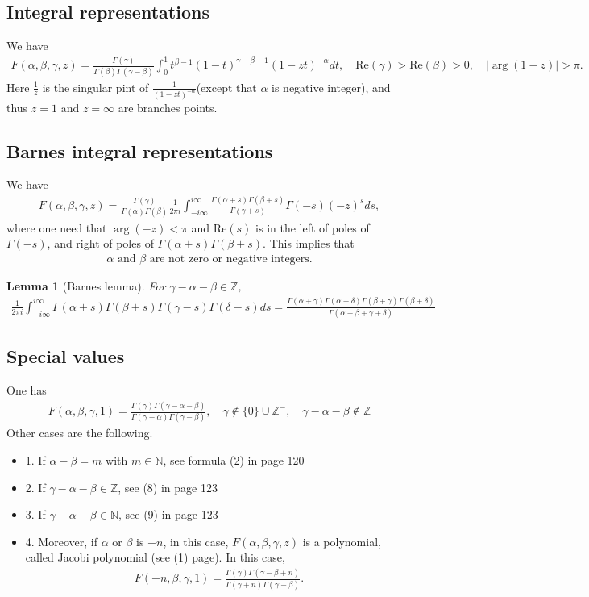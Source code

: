 \documentclass[11pt,reqno]{amsart}
\newcommand{\bna}{\begin{eqnarray*}}
\newcommand{\ena}{\end{eqnarray*}}
\def\re{{\mathrm{Re}}}
\def\Z{\mathbb{Z}}
\newtheorem{lemma}{Lemma}[section]
\theoremstyle{definition}
\newcommand{\bit}{\begin{itemize}}
\newcommand{\eit}{\end{itemize}}
\begin{document}
\subsection{Integral representations}
We have
\bna
F(\alpha,\beta,\gamma,z)=\frac{\Gamma(\gamma)}{\Gamma(\beta)\Gamma(\gamma-\beta)}
\int_0^1 t^{\beta-1}(1-t)^{\gamma-\beta-1}(1-zt)^{-\alpha}dt,
\quad \re(\gamma)>\re(\beta)>0,\quad |\arg(1-z)|>\pi.
\ena
Here $\frac{1}{z}$ is the singular pint of $\frac{1}{(1-zt)^{-\alpha}}$(except that $\alpha$ is negative integer),
and thus $z=1$ and $z=\infty$ are branches points.

\subsection{Barnes integral representations}
We have
\bna
F(\alpha,\beta,\gamma,z)=\frac{\Gamma(\gamma)}{\Gamma(\alpha)\Gamma(\beta)}
\frac{1}{2\pi i}\int_{-i\infty}^{i\infty}\frac{\Gamma(\alpha+s)\Gamma(\beta+s)}{\Gamma(\gamma+s)}
\Gamma(-s) (-z)^sds,
\ena
where one need that $\arg(-z)<\pi$ and
$\re(s)$ is in the left of poles of $\Gamma(-s)$,
and right of poles of $\Gamma(\alpha+s)\Gamma(\beta+s)$. This implies that
\bna
\mbox{$\alpha$ and $\beta$  are not zero or negative integers.}
\ena
\begin{lemma}[Barnes lemma]
For $\gamma-\alpha-\beta\in \Z$,
\bna
\frac{1}{2\pi i}\int_{-i\infty}^{i\infty}\Gamma(\alpha+s)\Gamma(\beta+s)
\Gamma(\gamma-s)\Gamma(\delta-s)ds
=\frac{\Gamma(\alpha+\gamma)\Gamma(\alpha+\delta)
\Gamma(\beta+\gamma)\Gamma(\beta+\delta)}
{\Gamma(\alpha+\beta+\gamma+\delta)}
\ena
\end{lemma}
\subsection{Special values}
One has
\bna
F(\alpha,\beta,\gamma,1)=\frac{\Gamma(\gamma)\Gamma(\gamma-\alpha-\beta)}
{\Gamma(\gamma-\alpha)\Gamma(\gamma-\beta)},
\quad \gamma\notin\{0\}\cup\Z^-,\quad \gamma-\alpha-\beta\notin\Z
\ena
Other cases are the following.
\bit
\item [1.]
If $\alpha-\beta=m$ with $m\in \mathbb N$,  see formula (2) in page 120
\item [2.] If $\gamma-\alpha-\beta\in \Z$, see (8) in page 123
\item [3.] If $\gamma-\alpha-\beta\in \mathbb N$, see (9) in page 123
\item [4.]
Moreover, if $\alpha$ or $\beta$ is $-n$, in this case, $F(\alpha,\beta,\gamma,z)$
is a polynomial, called Jacobi polynomial (see (1) page). In this case,
\bna
F(-n,\beta,\gamma,1)=\frac{\Gamma(\gamma)\Gamma(\gamma-\beta+n)}{\Gamma(\gamma+n)\Gamma(\gamma-\beta)}.
\ena
\eit
\end{document}
